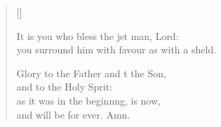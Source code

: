 \begin{verse}[\versewidth]
\begin{patverse}
It is you who bless the jst man, Lord:\Med\\
    you surround him with favour as with a sh\pointup{\i}eld.

Glory to the Father and t the Son,\Med\\
    and to the Holy Sp\pointup{\i}rit:\\
as it was in the beginn\pointup{\i}ng, is now,\Med\\
    and will be for ever. Amn.
  \end{patverse}
\end{verse}
